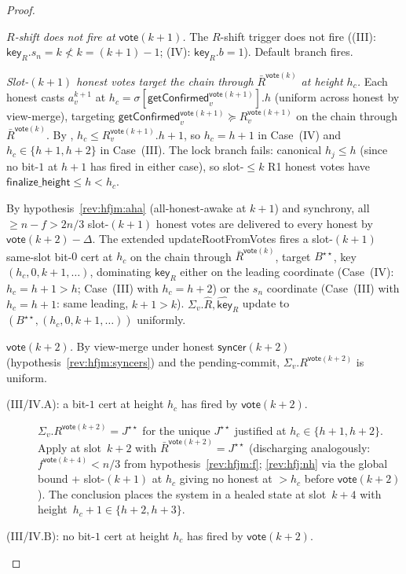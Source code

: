 \ifx\litemode\undefined\documentclass{article}\fi
\newcommand{\finalizeHeight}{\mathsf{finalize\_height}}
\newcommand{\key}{\mathsf{key}}
\newcommand{\syncer}{\mathsf{syncer}}
\newcommand{\vote}{\mathsf{vote}}
\newcommand{\comm}[1]{\bar{#1}}
\newcommand{\updateRootFromVotes}{\textsf{updateRootFromVotes}\xspace}
\newcommand{\getConfirmed}{\textsf{getConfirmed}\xspace}
\theoremstyle{plain}
\theoremstyle{definition}
\theoremstyle{remark}
\newcommand{\AHA}{all-honest-awake\xspace}
\begin{document}
\begin{proof}
\begin{description}
\emph{$R$-shift does not fire at $\vote(k+1)$.}
The $R$-shift trigger does not fire ((III): $\key_R.s_n = k \not< k = (k+1)-1$; (IV): $\key_R.b = 1$). Default branch fires.

\emph{Slot-$(k+1)$ honest votes target the chain through $\comm{R}^{\vote(k)}$ at height $h_c$.}
Each honest casts $a^{k+1}_v$ at $h_c = \sigma[\getConfirmed_v^{\vote(k+1)}].h$ (uniform across honest by view-merge), targeting $\getConfirmed_v^{\vote(k+1)} \succeq R_v^{\vote(k+1)}$ on the chain through $\comm{R}^{\vote(k)}$. By , $h_c \leq R_v^{\vote(k+1)}.h + 1$, so $h_c = h+1$ in Case~(IV) and $h_c \in \{h+1, h+2\}$ in Case~(III). The lock branch fails: canonical $h_j \leq h$ (since no bit-$1$ at $h+1$ has fired in either case), so slot-$\leq k$ R1 honest votes have $\finalizeHeight \leq h < h_c$.

By hypothesis~\ref{rev:hfjm:aha} (\AHA at $k+1$) and synchrony, all $\geq n - f > 2n/3$ slot-$(k+1)$ honest votes are delivered to every honest by $\vote(k+2) - \Delta$. The extended \updateRootFromVotes{} fires a slot-$(k+1)$ same-slot bit-$0$ cert at $h_c$ on the chain through $\comm{R}^{\vote(k)}$, target $B^{\star\star}$, key $(h_c, 0, k+1, \ldots)$, dominating $\key_R$ either on the leading coordinate (Case~(IV): $h_c = h+1 > h$; Case~(III) with $h_c = h+2$) or the $s_n$ coordinate (Case~(III) with $h_c = h+1$: same leading, $k+1 > k$). $\Sigma_v.\hat{R}, \hat{\key}_R$ update to $(B^{\star\star}, (h_c, 0, k+1, \ldots))$ uniformly.

\emph{$\vote(k+2)$.}
By view-merge under honest $\syncer(k+2)$ (hypothesis~\ref{rev:hfjm:syncers}) and the pending-commit, $\Sigma_v.R^{\vote(k+2)}$ is uniform.

\begin{description}
\item[{(III/IV.A): a bit-$1$ cert at height $h_c$ has fired by $\vote(k+2)$.}]\hfill

$\Sigma_v.R^{\vote(k+2)} = J^{\star\star}$ for the unique $J^{\star\star}$ justified at $h_c \in \{h+1, h+2\}$. Apply  at slot~$k+2$ with $\comm{R}^{\vote(k+2)} = J^{\star\star}$ (discharging analogously: $f^{\vote(k+4)} < n/3$ from hypothesis~\ref{rev:hfjm:f}; \ref{rev:hfj:nh} via the global bound + slot-$(k+1)$ at $h_c$ giving no honest at $> h_c$ before $\vote(k+2)$). The conclusion places the system in a healed state at slot~$k+4$ with height~$h_c + 1 \in \{h+2, h+3\}$.

\item[{(III/IV.B): no bit-$1$ cert at height $h_c$ has fired by $\vote(k+2)$.}]\hfill


\end{description}
\end{description}
\end{proof}
\end{document}
